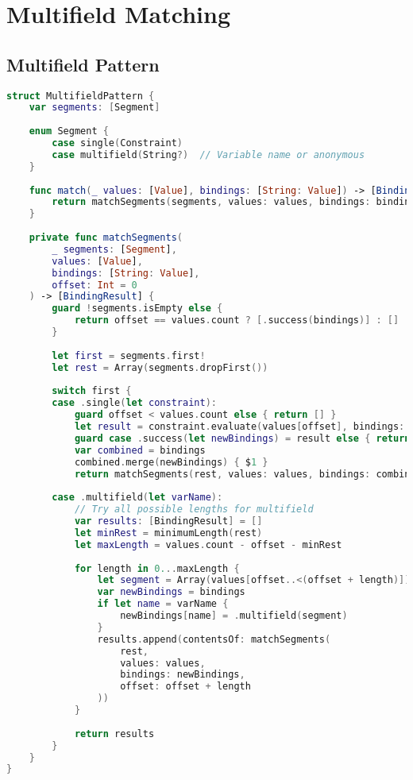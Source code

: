 \section{Multifield Matching}

\subsection{Multifield Pattern}

\begin{lstlisting}[language=Swift]
struct MultifieldPattern {
    var segments: [Segment]
    
    enum Segment {
        case single(Constraint)
        case multifield(String?)  // Variable name or anonymous
    }
    
    func match(_ values: [Value], bindings: [String: Value]) -> [BindingResult] {
        return matchSegments(segments, values: values, bindings: bindings)
    }
    
    private func matchSegments(
        _ segments: [Segment],
        values: [Value],
        bindings: [String: Value],
        offset: Int = 0
    ) -> [BindingResult] {
        guard !segments.isEmpty else {
            return offset == values.count ? [.success(bindings)] : []
        }
        
        let first = segments.first!
        let rest = Array(segments.dropFirst())
        
        switch first {
        case .single(let constraint):
            guard offset < values.count else { return [] }
            let result = constraint.evaluate(values[offset], bindings: bindings)
            guard case .success(let newBindings) = result else { return [] }
            var combined = bindings
            combined.merge(newBindings) { $1 }
            return matchSegments(rest, values: values, bindings: combined, offset: offset + 1)
            
        case .multifield(let varName):
            // Try all possible lengths for multifield
            var results: [BindingResult] = []
            let minRest = minimumLength(rest)
            let maxLength = values.count - offset - minRest
            
            for length in 0...maxLength {
                let segment = Array(values[offset..<(offset + length)])
                var newBindings = bindings
                if let name = varName {
                    newBindings[name] = .multifield(segment)
                }
                results.append(contentsOf: matchSegments(
                    rest,
                    values: values,
                    bindings: newBindings,
                    offset: offset + length
                ))
            }
            
            return results
        }
    }
}
\end{lstlisting}

